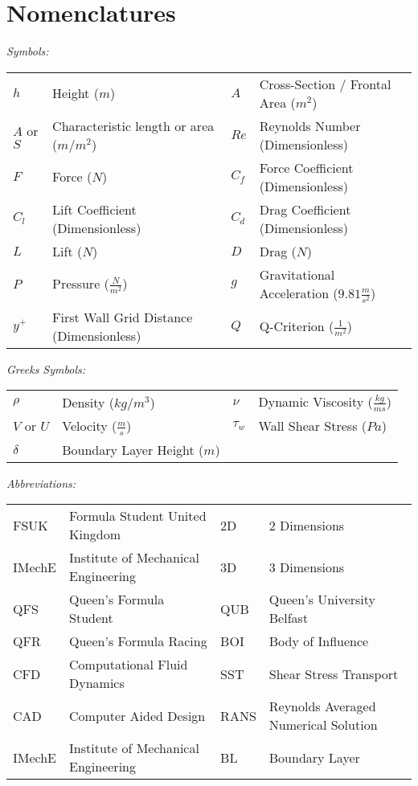 \newpage
\thispagestyle{empty}
\section*{Nomenclatures} 
\flushleft
\begin{doublespace}
\textit{Symbols:}

\begin{tabular}{l l  l l }
$h$ & Height ($m$) & $A$ & Cross-Section / Frontal Area ($m^2$) \\
$A$ or $S$ & Characteristic length or area ($m$/$m^2$) & $Re$ & Reynolds Number (Dimensionless) \\
$F$ & Force ($N$) & $C_f$ & Force Coefficient (Dimensionless)\\
$C_l$ & Lift Coefficient (Dimensionless) & $C_d$ & Drag Coefficient (Dimensionless) \\
$L$ & Lift ($N$) & $D$ & Drag ($N$) \\
$P$ & Pressure ($\frac{N}{m^2}$) & $g$ & Gravitational Acceleration ($9.81\frac{m}{s^2}$)\\
$y^+$ & First Wall Grid Distance (Dimensionless) & $Q$ & Q-Criterion ($\frac{1}{m^2}$) \\
\end{tabular}

\textit{Greeks Symbols:}

\begin{tabular}{llll}
$\rho$ & Density ($kg/m^3$) & $\nu$ & Dynamic Viscosity ($\frac{kg}{ms}$) \\
$V$ or $U$ & Velocity ($\frac{m}{s}$) & $\tau_w$ & Wall Shear Stress ($Pa$)\\
$\delta$ & Boundary Layer Height ($m$) \\
\end{tabular}


\textit{Abbreviations:}

\begin{tabular}{llll}
FSUK & Formula Student United Kingdom & 2D & 2 Dimensions \\
IMechE & Institute of Mechanical Engineering & 3D & 3 Dimensions\\
QFS & Queen's Formula Student & QUB & Queen's University Belfast\\
QFR & Queen's Formula Racing & BOI & Body of Influence\\
CFD & Computational Fluid Dynamics & SST & Shear Stress Transport\\
CAD & Computer Aided Design & RANS & Reynolds Averaged Numerical Solution\\
IMechE & Institute of Mechanical Engineering & BL & Boundary Layer\\
\end{tabular}
\end{doublespace}